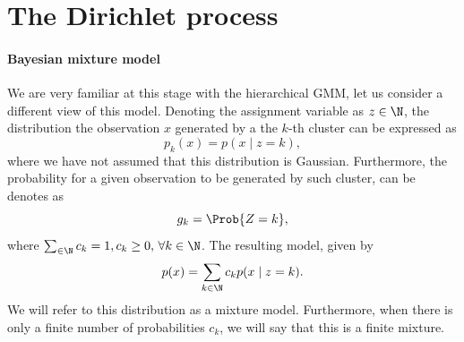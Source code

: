 

\section{The Dirichlet process}
\label{sec:ch4_Dirichilet_process}




\paragraph{Bayesian mixture model} We are very familiar at this stage with the hierarchical GMM, let us consider a different view of this model. Denoting the assignment variable as $z\in\N$, the distribution the observation $x$ generated by a the $k$-th cluster can be expressed as 
\begin{equation}
    p_k(x) = p(x \mid z=k),
\end{equation}
where we have not assumed that this distribution is Gaussian. Furthermore, the probability for a given observation to be generated by such cluster, can be denotes as 
\begin{equation}
    g_k = \Prob{Z=k},
\end{equation}
where $\sum_{\in\N}c_k = 1, c_k\geq0,\, \forall k\in\N$. The resulting model, given by
\begin{equation}
p(x) = \sum_{k\in\N} c_k p(x \mid z=k).    
\end{equation}
We will refer to this distribution as a mixture model. Furthermore, when there is only a finite number of probabilities $c_k$, we will say that this is a finite mixture. 

